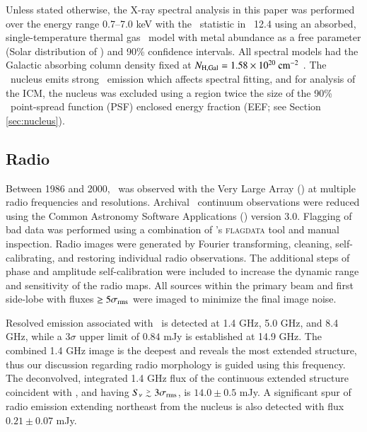 \documentclass[referee,traditabstract]{aa}
\begin{document}
Unless stated otherwise, the X-ray spectral analysis in this paper was
performed over the energy range 0.7--7.0 keV with the
\chisq\ statistic in \xspec\ 12.4 \citep{xspec} using an absorbed,
single-temperature thermal gas \mekal\ model \citep{mekal1} with metal
abundance as a free parameter (Solar distribution of \citealt{ag89})
and 90\% confidence intervals. All spectral models had the Galactic
absorbing column density fixed at $N_{\rm{H,Gal}} = 1.58 \times 10^{20}
~\mbox{\ensuremath{\rm{cm^{-2}}}}$ \citep{lab}. The \irs\ nucleus emits strong \feka\ emission
which affects spectral fitting, and for analysis of the ICM, the
nucleus was excluded using a region twice the size of the 90\%
\cxo\ point-spread function (PSF) enclosed energy fraction (EEF; see
Section \ref{sec:nucleus}).

\subsection{Radio}
\label{sec:radio}

Between 1986 and 2000, \irs\ was observed with the Very Large Array
(\vla) at multiple radio frequencies and resolutions. Archival
\vla\ continuum observations were reduced using the Common Astronomy
Software Applications (\casa) version 3.0. Flagging of bad data was
performed using a combination of \casa's {\textsc{flagdata}} tool and
manual inspection. Radio images were generated by Fourier
transforming, cleaning, self-calibrating, and restoring individual
radio observations. The additional steps of phase and amplitude
self-calibration were included to increase the dynamic range and
sensitivity of the radio maps. All sources within the primary beam and
first side-lobe with fluxes $\ge 5\sigma_{\rm{rms}}$ were imaged to
minimize the final image noise.

Resolved emission associated with \irs\ is detected at 1.4 GHz, 5.0
GHz, and 8.4 GHz, while a $3\sigma$ upper limit of $0.84$ mJy is
established at 14.9 GHz. The combined 1.4 GHz image is the deepest and
reveals the most extended structure, thus our discussion regarding
radio morphology is guided using this frequency. The deconvolved,
integrated 1.4 GHz flux of the continuous extended structure
coincident with \irs, and having $S_{\nu} \ga 3\sigma_{\rm{rms}}$, is
$14.0 \pm 0.5$ mJy. A significant spur of radio emission extending
northeast from the nucleus is also detected with flux $0.21 \pm 0.07$
mJy.
\end{document}
